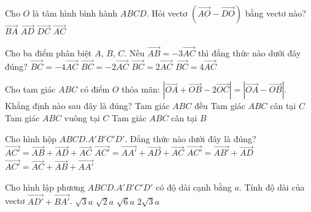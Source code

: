 \begin{ex}
	Cho $O$ là tâm hình bình hành $ABCD$. Hỏi vectơ $\left(\vec{AO}-\vec{DO}\right)$ bằng vectơ nào?
	\choice
	{$\vec{BA}$}
	{\True $\vec{AD}$}
	{$\vec{DC}$}
	{$\vec{AC}$}
\end{ex}
\begin{ex}
	Cho ba điểm phân biệt $A$, $B$, $C$. Nếu $\vec{AB}=-3\vec{AC}$ thì đẳng thức nào dưới đây đúng?
	\choice
	{$\vec{BC}=-4\vec{AC}$}
	{$\vec{BC}=-2\vec{AC}$}
	{$\vec{BC}=2\vec{AC}$}
	{\True $\vec{BC}=4\vec{AC}$}
\end{ex}
\begin{ex}
	Cho tam giác $ABC$ có điểm $O$ thỏa mãn: $\left| \vec{OA}+\vec{OB}-2\vec{OC} \right| = \left| \vec{OA}-\vec{OB} \right|$. Khẳng định nào sau đây là đúng?
	\choice
	{Tam giác $ABC$ đều}
	{Tam giác $ABC$ cân tại $C$}
	{\True Tam giác $ABC$ vuông tại $C$}
	{Tam giác $ABC$ cân tại $B$}
\end{ex}
\begin{ex}
	Cho hình hộp $ABCD.A'B'C'D'$. Đẳng thức nào dưới đây là đúng?
	\choice
	{$\vec{AC'}=\vec{AB}+\vec{AD}+\vec{AC}$}
	{$\vec{AC'}=\vec{AA'}+\vec{AD}+\vec{AC}$}
	{\True $\vec{AC'}=\vec{AB'}+\vec{AD}$}
	{$\vec{AC'}=\vec{AC}+\vec{AB}+\vec{AA'}$}
\end{ex}
\begin{ex}
	Cho hình lập phương $ABCD.A'B'C'D'$ có độ dài cạnh bằng $a$. Tính độ dài của vectơ $\vec{AD'}+\vec{BA'}$.
	\choice
	{$\sqrt{3}a$}
	{$\sqrt{2}a$}
	{\True $\sqrt{6}a$}
	{$2\sqrt{3}a$}
\end{ex}
